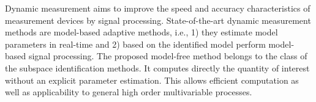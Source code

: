 \documentclass[11pt]{article}
\begin{document}
\citet{Markovsky15ieee} Dynamic measurement aims to improve the speed and accuracy characteristics of measurement devices by signal processing. State-of-the-art dynamic measurement methods are model-based adaptive methods, i.e., 1) they estimate model parameters in real-time and 2) based on the identified model perform model-based signal processing. The proposed model-free method belongs to the class of the subspace identification methods. It computes directly the quantity of interest without an explicit parameter estimation. This allows efficient computation as well as applicability to general high order multivariable processes.


\medskip

\end{document}
